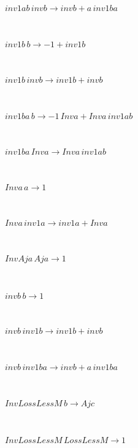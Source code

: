 \documentclass[rep10,leqno]{report}
\begin{document}
\begin{minipage}{6in}
$
inv1ab\,
 invb\rightarrow invb + a\,
 inv1ba
$
\end{minipage}\medskip \\
\begin{minipage}{6in}
$
inv1b\,
 b\rightarrow -1 + inv1b
$
\end{minipage}\medskip \\
\begin{minipage}{6in}
$
inv1b\,
 invb\rightarrow inv1b + invb
$
\end{minipage}\medskip \\
\begin{minipage}{6in}
$
inv1ba\,
 b\rightarrow -1\,
 Inva + Inva\,
 inv1ab
$
\end{minipage}\medskip \\
\begin{minipage}{6in}
$
inv1ba\,
 Inva\rightarrow Inva\,
 inv1ab
$
\end{minipage}\medskip \\
\begin{minipage}{6in}
$
Inva\,
 a\rightarrow 1
$
\end{minipage}\medskip \\
\begin{minipage}{6in}
$
Inva\,
 inv1a\rightarrow inv1a + Inva
$
\end{minipage}\medskip \\
\begin{minipage}{6in}
$
InvAja\,
 Aja\rightarrow 1
$
\end{minipage}\medskip \\
\begin{minipage}{6in}
$
invb\,
 b\rightarrow 1
$
\end{minipage}\medskip \\
\begin{minipage}{6in}
$
invb\,
 inv1b\rightarrow inv1b + invb
$
\end{minipage}\medskip \\
\begin{minipage}{6in}
$
invb\,
 inv1ba\rightarrow invb + a\,
 inv1ba
$
\end{minipage}\medskip \\
\begin{minipage}{6in}
$
InvLossLessM\,
 b\rightarrow Ajc
$
\end{minipage}\medskip \\
\begin{minipage}{6in}
$
InvLossLessM\,
 LossLessM\rightarrow 1
$
\end{minipage}\medskip \\
\end{document}
